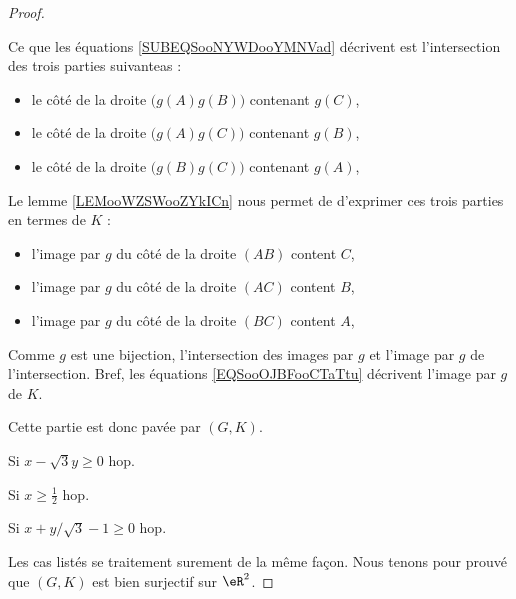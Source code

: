 \begin{proof}
\begin{subproof}
\begin{subproof}
\begin{subproof}
\begin{subequations}
                            \end{subequations}
                            Ce que les équations \eqref{SUBEQSooNYWDooYMNVad} décrivent est l'intersection des trois parties suivanteas :
                            \begin{itemize}
                                \item le côté de la droite \( \big( g(A)g(B)\big)\) contenant \( g(C)\),
                                \item le côté de la droite \( \big( g(A)g(C)\big)\) contenant \( g(B)\),
                                \item le côté de la droite \( \big( g(B)g(C)\big)\) contenant \( g(A)\),
                            \end{itemize}
                            Le lemme \ref{LEMooWZSWooZYkICn} nous permet de d'exprimer ces trois parties en termes de \( K\) :
                            \begin{itemize}
                                \item l'image par \( g\) du côté de la droite \( (AB)\) content \( C\),
                                \item l'image par \( g\) du côté de la droite \( (AC)\) content \( B\),
                                \item l'image par \( g\) du côté de la droite \( (BC)\) content \( A\),
                            \end{itemize}
                            Comme \( g\) est une bijection, l'intersection des images par \( g\) et l'image par \( g\) de l'intersection. Bref, les équations \eqref{EQSooOJBFooCTaTtu} décrivent l'image par \( g\) de \( K\).

                            Cette partie est donc pavée par \( (G,K)\).
                        \item[Si \( x-\sqrt{ 3 }y\geq 0\)]
                            hop.
                    \end{subproof}
                     
                \item[Si \( x\geq \frac{ 1 }{2}\)]
                    hop.
            \end{subproof}
        \item[Si \( x+y/\sqrt{ 3 }-1\geq 0\)]
            hop.
    \end{subproof}
    Les cas listés se traitement surement de la même façon. Nous tenons pour prouvé que \( (G,K)\) est bien surjectif sur \( \eR^2\).


\end{proof}
